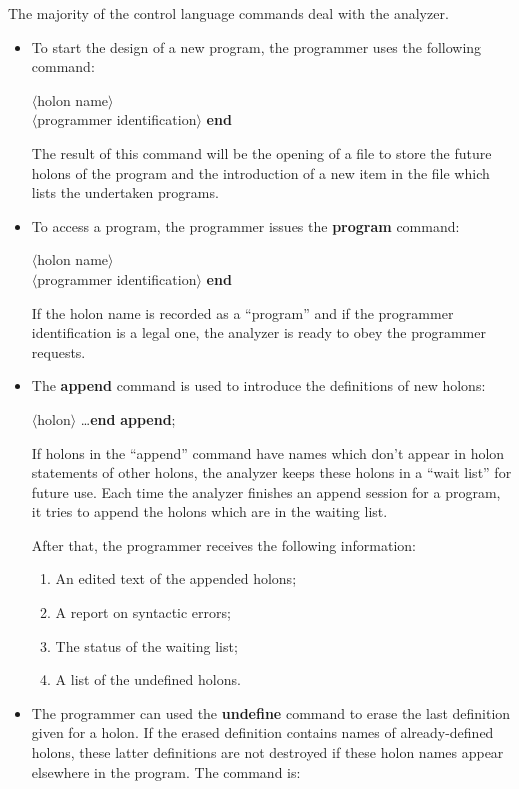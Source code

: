 \documentclass[openany,nobib]{tufte-book}
\newcommand{\kw}[1]{{\bf #1}}
\newcommand{\sym}[1]{$\langle$#1$\rangle$}
\begin{document}
The majority of the control language commands deal with the analyzer.
\begin{itemize}
    \item[(A)] To start the design of a new program, the programmer uses the
following command:

    \smallskip
    \-\hspace{0.3cm}\kw{new program} \sym{holon name} \\
    \-\hspace{0.6cm}\kw{by} \sym{programmer identification} \kw{end}

    \smallskip
    The result of this command will be the opening of a file to store the
future holons of the program and the introduction of a new item in the file
which lists the undertaken programs.
    \item[(B)] To access a program, the programmer issues the \kw{program}
command:

    \smallskip
    \-\hspace{0.3cm}\kw{program} \sym{holon name} \\
    \-\hspace{0.6cm}\kw{by} \sym{programmer identification} \kw{end}

    \smallskip
    If the holon name is recorded as a ``program'' and if the programmer
identification is a legal one, the analyzer is ready to obey the programmer
requests.
    \item[(C)] The \kw{append} command is used to introduce the definitions of
new holons:

    \smallskip
    \-\hspace{0.3cm}\kw{append} \sym{holon} \dots \kw{end} \kw{append};

    \smallskip
    If holons in the ``append'' command have names which don't appear in holon
statements of other holons, the analyzer keeps these holons in a ``wait list''
for future use. Each time the analyzer finishes an append session for a
program, it tries to append the holons which are in the waiting list.

    After that, the programmer receives the following information:
    \begin{enumerate}
        \item An edited text of the appended holons;
        \item A report on syntactic errors;
        \item The status of the waiting list;
        \item A list of the undefined holons.
    \end{enumerate}
    \item[(D)] The programmer can used the \kw{undefine} command to erase the
last definition given for a holon. If the erased definition contains names of
already-defined holons, these latter definitions are not destroyed if these
holon names appear elsewhere in the program. The command is:


\end{itemize}
\end{document}
